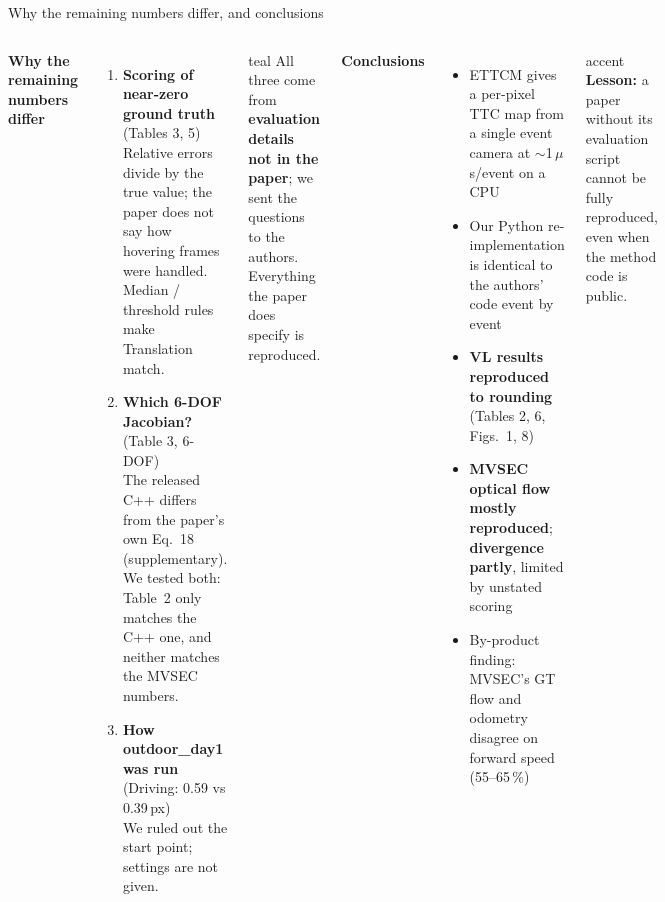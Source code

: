\documentclass[aspectratio=169,10pt]{beamer}
\newcommand{\us}{\,$\mu$s}
\begin{document}
\begin{frame}{Why the remaining numbers differ, and conclusions}
  \begin{columns}[T,onlytextwidth]
    {\color{titlebar}\bfseries Why the remaining numbers differ}
    \begin{enumerate}\footnotesize\setlength{\itemsep}{1pt}
      \item \textbf{Scoring of near-zero ground truth} (Tables 3, 5)\\
        {\footnotesize Relative errors divide by the true value; the paper does not say how hovering frames were handled.
        Median / threshold rules make Translation match.}
      \item \textbf{Which 6-DOF Jacobian?} (Table 3, 6-DOF)\\
        {\footnotesize The released C++ \alert{differs from the paper's own Eq.~18} (supplementary). We tested both:
        Table~2 only matches the C++ one, and neither matches the MVSEC numbers.}
      \item \textbf{How outdoor\_day1 was run} (Driving: 0.59 vs 0.39\,px)\\
        {\footnotesize We ruled out the start point; settings are not given.}
    \end{enumerate}
    \begin{card}[fontupper=\footnotesize\raggedright,top=2pt,bottom=2pt,before skip=1mm]{teal}
      All three come from \textbf{evaluation details not in the paper}; we sent the questions to the authors.
      Everything the paper does specify is reproduced.
    \end{card}
    {\color{titlebar}\bfseries Conclusions}
    \begin{itemize}\footnotesize\setlength{\itemsep}{1pt}
      \item ETTCM gives a \alert{per-pixel TTC map} from a single event camera at $\sim$1\us/event on a CPU
      \item Our Python re-implementation is \alert{identical to the authors' code} event by event
      \item \textbf{VL results reproduced to rounding} (Tables 2, 6, Figs.~1, 8)
      \item \textbf{MVSEC optical flow mostly reproduced}; \textbf{divergence partly}, limited by unstated scoring
      \item By-product finding: \alert{MVSEC's GT flow and odometry disagree} on forward speed (55--65\,\%)
    \end{itemize}
    \begin{card}[fontupper=\footnotesize\raggedright,top=2pt,bottom=2pt,before skip=1mm]{accent}
      \textbf{Lesson:} a paper without its evaluation script cannot be fully reproduced, even when the method
      code is public.
    \end{card}
  \end{columns}
\end{frame}
\end{document}
